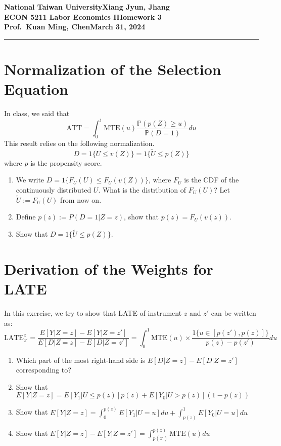 \documentclass[11pt]{article}
\newcommand{\myname}{Xiang Jyun, Jhang}
\newcommand{\assignment}{Homework 3}
\newcommand{\duedate}{March 31, 2024}
\newcommand{\pr}{\mathbb{P}}
\begin{document}
\textbf{National Taiwan University}\hfill\textbf{\myname}\\[0.01in]
\textbf{ECON 5211 Labor Economics I}\hfill\textbf{\assignment}\\[0.01in]
\textbf{Prof.\ Kuan Ming, Chen}\hfill\textbf{\duedate}\\
\smallskip\hrule\bigskip


\section{Normalization of the Selection Equation}

    In class, we said that 
    \[
        \text{ATT} = \int_{0}^{1} \text{MTE}(u) \frac{\pr(p(Z)\geq u)}{\pr(D=1)}du 
    \] 
    This result relies on the following normalization.
    \[ 
        D = 1\{U \leq v(Z)\} = 1\{\tilde{U} \leq p(Z)\} 
    \]
    where $p$ is the propensity score.
    \begin{enumerate}
        \item We write \( D = 1\{F_U(U) \leq F_U(v(Z))\} \), where \( F_U \) is the CDF of the continuously distributed \( U \). What is the distribution of \( F_U(U) \)? Let \( \tilde{U} := F_U(U) \) from now on.
        \item Define \( p(z) := P(D = 1|Z = z) \), show that \( p(z) = F_U(v(z)) \).
        \item Show that \( D = 1\{\tilde{U} \leq p(Z)\} \).
    \end{enumerate}


\section{Derivation of the Weights for LATE}

    In this exercise, we try to show that LATE of instrument \( z \) and \( z' \) can be written as:
    \[ \text{LATE}_{z'}^{z} = \frac{E[Y|Z=z] - E[Y|Z=z']}{E[D|Z=z] - E[D|Z=z']} = \int_{0}^{1} \text{MTE}(u) \times \frac{1\{u \in [p(z'),p(z)]\}}{p(z) - p(z')} du \]

    \begin{enumerate}
        \item Which part of the most right-hand side is \( E[D|Z=z] - E[D|Z=z'] \) corresponding to?
        \item Show that \( E[Y|Z=z] = E[Y_1|U \leq p(z)]p(z) + E[Y_0|U > p(z)](1 - p(z)) \)
        \item Show that \( E[Y|Z=z] = \int_{0}^{p(z)} E[Y_1|U = u] du + \int_{p(z)}^{1} E[Y_0|U = u] du \)
        \item Show that \( E[Y|Z=z] - E[Y|Z=z'] = \int_{p(z')}^{p(z)} \text{MTE}(u) du \)
    \end{enumerate}
\end{document}
